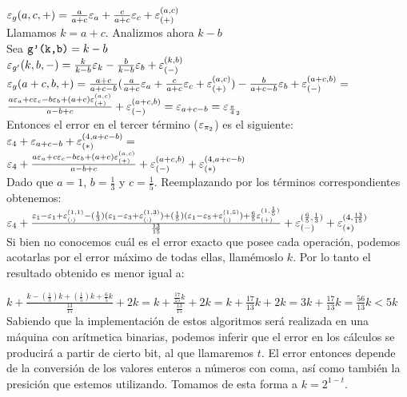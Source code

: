 	$\varepsilon _{g}({a,c,+}) = \frac{a}{a+c}\varepsilon _{a} + \frac{c}{a+c}\varepsilon _{c} + \varepsilon _{({+})}^{({a,c})}$\\
	
	Llamamos $k=a+c$. Analizmos ahora $k-b$\\
	
	Sea $\texttt{g'(k,b)}=k-b$\\
	
	$\varepsilon _{g'}({k,b,-}) = \frac{k}{k-b}\varepsilon _{k} - \frac{b}{k-b}\varepsilon _{b} + \varepsilon _{({-})}^{({k,b})}$\\
	
	$\varepsilon _{g}({a+c,b,+}) = \frac{a+c}{a+c-b}(\frac{a}{a+c}\varepsilon _{a} + \frac{c}{a+c}\varepsilon _{c} + \varepsilon _{({+})}^{({a,c})}) - \frac{b}{a+c-b}\varepsilon _{b} + \varepsilon _{({-})}^{({a+c,b})} =$\\
	
	$\frac{a\varepsilon _{a} + c\varepsilon _{c} - b\varepsilon _{b} + (a+c)\varepsilon _{({+})}^{({a,c})}}{a-b+c} + \varepsilon _{({-})}^{({a+c,b})} = \varepsilon _{a+c-b} = \varepsilon _{\frac{\pi}{4}_2}$\\
	
	Entonces el error en el tercer término ($\varepsilon _{\pi_2}$) es el siguiente:\\
	
	$\varepsilon _{4} + \varepsilon _{a+c-b} + \varepsilon _{({*})}^{({4,a+c-b})} =$\\
	
	$\varepsilon _{4} + \frac{a\varepsilon _{a} + c\varepsilon _{c} - b\varepsilon _{b} + (a+c)\varepsilon _{({+})}^{({a,c})}}{a-b+c} + \varepsilon _{({-})}^{({a+c,b})} + \varepsilon _{({*})}^{({4,a+c-b})}$\\
	
	Dado que $a=1$, $b=\frac{1}{3}$ y $c=\frac{1}{5}$. Reemplazando por los términos correspondientes obtenemos:\\
	
	$\varepsilon _{4} + \frac{\varepsilon _{1} - \varepsilon _{1} + \varepsilon _{({:})}^{({1,1})} - (\frac{1}{3})(\varepsilon _{1} - \varepsilon _{3} + \varepsilon _{({:})}^{({1,3})}) + (\frac{1}{5})(\varepsilon _{1} - \varepsilon _{5} + \varepsilon _{({:})}^{({1,5})}) + \frac{6}{5} \varepsilon _{({+})}^{({1,\frac{1}{5}})}}{\frac{13}{15}} + \varepsilon _{({-})}^{({\frac{6}{5},\frac{1}{3}})} + \varepsilon _{({*})}^{({4,\frac{13}{15}})}$\\
	
	Si bien no conocemos cuál es el error exacto que posee cada operación, podemos acotarlas por el error máximo de todas ellas, llamémoslo $k$. Por lo tanto el resultado obtenido es menor igual a:

$k + \frac{k - (\frac{1}{3})k + (\frac{1}{5})k + \frac{6}{5}k}{\frac{13}{15}} + 2k = k + \frac{\frac{17}{15}k}{\frac{13}{15}} + 2k = k + \frac{17}{13}k + 2k = 3k + \frac{17}{13}k = \frac{56}{13}k < 5k $ \\

	Sabiendo que la implementación de estos algoritmos será realizada en una máquina con arítmetica binarias, podemos inferir que el error en los cálculos se producirá a partir de cierto bit, al que llamaremos $t$. El error entonces depende de la conversión de los valores enteros a números con coma, así como también la presición que estemos utilizando. Tomamos de esta forma a $k=2^{1-t}$.
	
